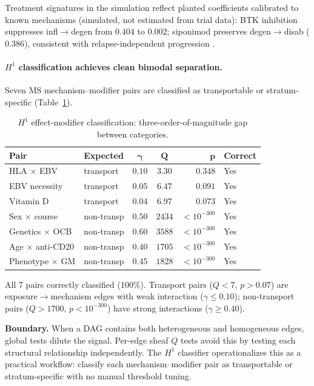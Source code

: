 \documentclass[11pt]{article}
\begin{document}
Treatment signatures in the simulation reflect planted coefficients calibrated to known mechanisms (simulated, not estimated from trial data): BTK inhibition suppresses infl$\to$degen from $0.404$ to $0.002$; siponimod preserves degen$\to$disab ($0.386$), consistent with relapse-independent progression \citep{kappos2018siponimod}.

\paragraph{$H^1$ classification achieves clean bimodal separation.}
Seven MS mechanism--modifier pairs are classified as transportable or stratum-specific (Table~\ref{tab:h1}).

\begin{table}[t]
\centering
\caption{$H^1$ effect-modifier classification: three-order-of-magnitude gap between categories.}
\label{tab:h1}
\small
\begin{tabular}{@{}llccrl@{}}
\toprule
\textbf{Pair} & \textbf{Expected} & $\boldsymbol{\gamma}$ & $\boldsymbol{Q}$ & $\boldsymbol{p}$ & \textbf{Correct} \\
\midrule
HLA $\times$ EBV & transport & $0.10$ & $3.30$ & $0.348$ & Yes \\
EBV necessity & transport & $0.05$ & $6.47$ & $0.091$ & Yes \\
Vitamin D & transport & $0.04$ & $6.97$ & $0.073$ & Yes \\
\midrule
Sex $\times$ course & non-transp & $0.50$ & $2434$ & $< 10^{-300}$ & Yes \\
Genetics $\times$ OCB & non-transp & $0.60$ & $3588$ & $< 10^{-300}$ & Yes \\
Age $\times$ anti-CD20 & non-transp & $0.40$ & $1705$ & $< 10^{-300}$ & Yes \\
Phenotype $\times$ GM & non-transp & $0.45$ & $1828$ & $< 10^{-300}$ & Yes \\
\bottomrule
\end{tabular}
\end{table}

All 7 pairs correctly classified (100\%).
Transport pairs ($Q < 7$, $p > 0.07$) are exposure$\to$mechanism edges with weak interaction ($\gamma \leq 0.10$); non-transport pairs ($Q > 1700$, $p < 10^{-300}$) have strong interactions ($\gamma \geq 0.40$).

\textbf{Boundary.} When a DAG contains both heterogeneous and homogeneous edges, global tests dilute the signal.
Per-edge sheaf $Q$ tests avoid this by testing each structural relationship independently.
The $H^1$ classifier operationalizes this as a practical workflow: classify each mechanism--modifier pair as transportable or stratum-specific with no manual threshold tuning.
\end{document}

